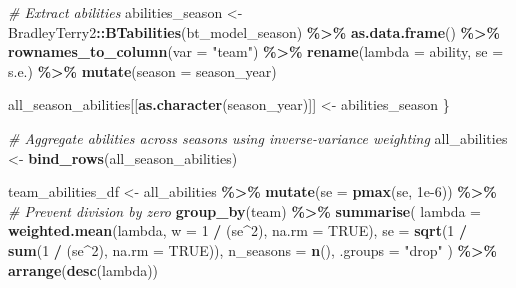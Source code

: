 \documentclass[
]{article}
\newenvironment{Shaded}{\begin{snugshade}}{\end{snugshade}}
\newcommand{\AttributeTok}[1]{\textcolor[rgb]{0.13,0.29,0.53}{#1}}
\newcommand{\CommentTok}[1]{\textcolor[rgb]{0.56,0.35,0.01}{\textit{#1}}}
\newcommand{\ConstantTok}[1]{\textcolor[rgb]{0.56,0.35,0.01}{#1}}
\newcommand{\DecValTok}[1]{\textcolor[rgb]{0.00,0.00,0.81}{#1}}
\newcommand{\FloatTok}[1]{\textcolor[rgb]{0.00,0.00,0.81}{#1}}
\newcommand{\FunctionTok}[1]{\textcolor[rgb]{0.13,0.29,0.53}{\textbf{#1}}}
\newcommand{\NormalTok}[1]{#1}
\newcommand{\OtherTok}[1]{\textcolor[rgb]{0.56,0.35,0.01}{#1}}
\newcommand{\SpecialCharTok}[1]{\textcolor[rgb]{0.81,0.36,0.00}{\textbf{#1}}}
\newcommand{\StringTok}[1]{\textcolor[rgb]{0.31,0.60,0.02}{#1}}
\begin{document}
\begin{Shaded}
\begin{Highlighting}[]
    \CommentTok{\# Extract abilities}
\NormalTok{    abilities\_season }\OtherTok{\textless{}{-}}\NormalTok{ BradleyTerry2}\SpecialCharTok{::}\FunctionTok{BTabilities}\NormalTok{(bt\_model\_season) }\SpecialCharTok{\%\textgreater{}\%}
        \FunctionTok{as.data.frame}\NormalTok{() }\SpecialCharTok{\%\textgreater{}\%}
        \FunctionTok{rownames\_to\_column}\NormalTok{(}\AttributeTok{var =} \StringTok{"team"}\NormalTok{) }\SpecialCharTok{\%\textgreater{}\%}
        \FunctionTok{rename}\NormalTok{(}\AttributeTok{lambda =}\NormalTok{ ability, }\AttributeTok{se =}\NormalTok{ s.e.) }\SpecialCharTok{\%\textgreater{}\%}
        \FunctionTok{mutate}\NormalTok{(}\AttributeTok{season =}\NormalTok{ season\_year)}

\NormalTok{    all\_season\_abilities[[}\FunctionTok{as.character}\NormalTok{(season\_year)]] }\OtherTok{\textless{}{-}}\NormalTok{ abilities\_season}
\NormalTok{\}}

\CommentTok{\# Aggregate abilities across seasons using inverse{-}variance weighting}
\NormalTok{all\_abilities }\OtherTok{\textless{}{-}} \FunctionTok{bind\_rows}\NormalTok{(all\_season\_abilities)}

\NormalTok{team\_abilities\_df }\OtherTok{\textless{}{-}}\NormalTok{ all\_abilities }\SpecialCharTok{\%\textgreater{}\%}
    \FunctionTok{mutate}\NormalTok{(}\AttributeTok{se =} \FunctionTok{pmax}\NormalTok{(se, }\FloatTok{1e{-}6}\NormalTok{)) }\SpecialCharTok{\%\textgreater{}\%} \CommentTok{\# Prevent division by zero}
    \FunctionTok{group\_by}\NormalTok{(team) }\SpecialCharTok{\%\textgreater{}\%}
    \FunctionTok{summarise}\NormalTok{(}
        \AttributeTok{lambda =} \FunctionTok{weighted.mean}\NormalTok{(lambda, }\AttributeTok{w =} \DecValTok{1} \SpecialCharTok{/}\NormalTok{ (se}\SpecialCharTok{\^{}}\DecValTok{2}\NormalTok{), }\AttributeTok{na.rm =} \ConstantTok{TRUE}\NormalTok{),}
        \AttributeTok{se =} \FunctionTok{sqrt}\NormalTok{(}\DecValTok{1} \SpecialCharTok{/} \FunctionTok{sum}\NormalTok{(}\DecValTok{1} \SpecialCharTok{/}\NormalTok{ (se}\SpecialCharTok{\^{}}\DecValTok{2}\NormalTok{), }\AttributeTok{na.rm =} \ConstantTok{TRUE}\NormalTok{)),}
        \AttributeTok{n\_seasons =} \FunctionTok{n}\NormalTok{(),}
        \AttributeTok{.groups =} \StringTok{"drop"}
\NormalTok{    ) }\SpecialCharTok{\%\textgreater{}\%}
    \FunctionTok{arrange}\NormalTok{(}\FunctionTok{desc}\NormalTok{(lambda))}


\end{Highlighting}
\end{Shaded}
\end{document}
